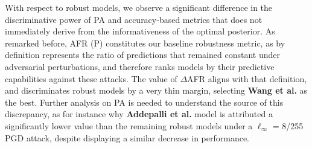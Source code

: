 With respect to robust models, we observe a significant difference in the 
discriminative power of PA and accuracy-based metrics that does not immediately
derive from the informativeness of the optimal posterior. As remarked before, AFR (P)
constitutes our baseline robustness metric, as by definition represents the ratio
of predictions that remained constant under adversarial perturbations, and
therefore ranks models by their predictive capabilities against these attacks. The
value of $\Delta$AFR aligns with that definition, and discriminates robust models
by a very thin margin, selecting {\color{tab:brown} \textbf{Wang et al.}} as
the best. Further analysis on PA is needed to understand the source of this 
discrepancy, as for instance why {\color{tab:purple} \textbf{Addepalli et al.}} model
is attributed a significantly lower value than the remaining robust models
under a $\ell_\infty$ = 8/255 PGD attack, despite displaying a similar decrease in performance. \\

